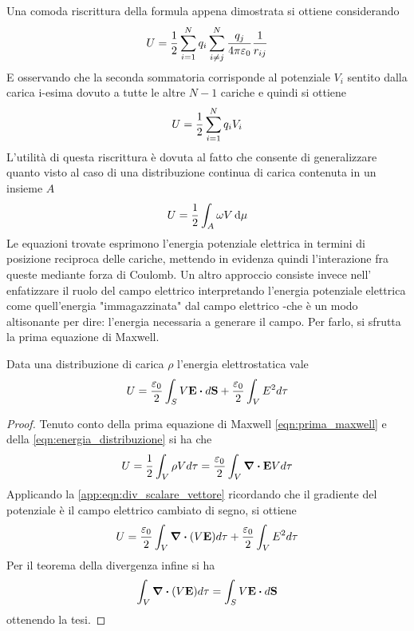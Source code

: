 Una comoda riscrittura della formula appena dimostrata si ottiene considerando
\[
    U=\frac{1}{2}\sum_{i=1}^Nq_i\sum_{i\neq j}^N\frac{q_j}{4\pi\varepsilon_0}\frac{1}{r_{ij}}
\]
E osservando che la seconda sommatoria corrisponde al potenziale $V_i$ sentito dalla carica
i-esima dovuto a tutte le altre $N-1$ cariche e quindi si ottiene
\begin{equation}
    U=\frac{1}{2}\sum_{i=1}^N q_i V_i
\end{equation}
L'utilità di questa riscrittura è dovuta al fatto che consente di generalizzare quanto visto
al caso di una distribuzione continua di carica contenuta in un insieme $A$
\begin{equation}
    \label{eqn:energia_distribuzione}
    U=\frac{1}{2}\int_{A} \omega V \dd{\mu}
\end{equation}
Le equazioni trovate esprimono l'energia potenziale elettrica in termini di posizione reciproca delle cariche, mettendo
in evidenza quindi l'interazione fra queste mediante forza di Coulomb. Un altro approccio consiste invece nell'
enfatizzare il ruolo del campo elettrico interpretando l'energia potenziale elettrica come quell'energia
"immagazzinata" dal campo elettrico -che è un modo altisonante per dire: l'energia necessaria a generare
il campo. Per farlo, si sfrutta la prima equazione di Maxwell.
\begin{thm}
    Data una distribuzione di carica $\rho$ l'energia elettrostatica vale
    \begin{equation}
        \label{eqn:UE}
        U=\frac{\epsilon_0}{2}\int_S V\vb{E}\vdot d\vb{S} + \frac{\epsilon_0}{2}\int_V E^2 d\tau
    \end{equation}
\end{thm}
\begin{proof}
    Tenuto conto della prima equazione di Maxwell \eqref{eqn:prima_maxwell} e della \eqref{eqn:energia_distribuzione} si ha che
    \[
        U=\frac{1}{2}\int_{V} \rho V d\tau=\frac{\varepsilon_0}{2}\int_V \div{\vb{E}} V d\tau
    \]
    Applicando la \eqref{app:eqn:div_scalare_vettore}
    ricordando che il gradiente del potenziale è il campo elettrico cambiato di segno, si ottiene
    \[
        U=\frac{\varepsilon_0}{2}\int_V \div{(V\vb{E})}d\tau + \frac{\varepsilon_0}{2}\int_V E^2 d\tau
    \]
    Per il teorema della divergenza infine si ha
    \[
        \int_V \div{(V\vb{E})}d\tau=\int_S V\vb{E}\vdot d\vb{S}
    \]
    ottenendo la tesi.
\end{proof}

